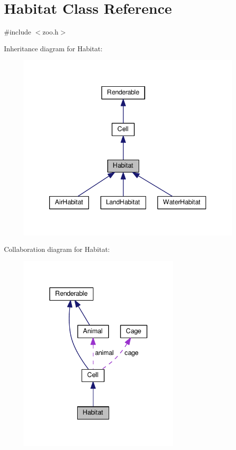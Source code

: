 \hypertarget{classHabitat}{}\section{Habitat Class Reference}
\label{classHabitat}


{\ttfamily \#include $<$zoo.\+h$>$}



Inheritance diagram for Habitat\+:
\nopagebreak
\begin{figure}[H]
\begin{center}
\leavevmode
\includegraphics[width=320pt]{classHabitat__inherit__graph}
\end{center}
\end{figure}


Collaboration diagram for Habitat\+:
\nopagebreak
\begin{figure}[H]
\begin{center}
\leavevmode
\includegraphics[width=228pt]{classHabitat__coll__graph}
\end{center}
\end{figure}
